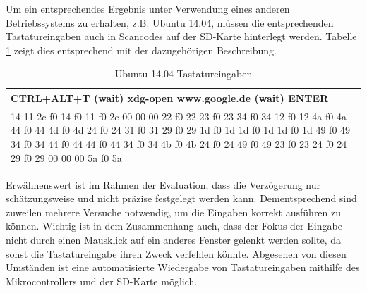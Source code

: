 Um ein entsprechendes Ergebnis unter Verwendung eines anderen Betriebssystems zu erhalten, z.B. Ubuntu 14.04, müssen die entsprechenden Tastatureingaben auch in Scancodes auf der SD-Karte hinterlegt werden. Tabelle \ref{linux_test} zeigt dies entsprechend mit der dazugehörigen Beschreibung.
\begin{table}
  \begin{tabularx}{\textwidth}{|X|} \hline
    CTRL+ALT+T (wait) xdg-open www.google.de (wait) ENTER \\ \hline
    14 11 2c f0 14 f0 11 f0 2c 00 00 00 22 f0 22 23 f0 23 34 f0 34 12 f0 12 4a f0 4a 44 f0 44 4d f0 4d 24 f0 24 31 f0 31 29 f0 29 1d f0 1d 1d f0 1d 1d f0 1d 49 f0 49 34 f0 34 44 f0 44 44 f0 44 34 f0 34 4b f0 4b 24 f0 24 49 f0 49 23 f0 23 24 f0 24 29 f0 29 00 00 00 5a f0 5a \\ \hline
  \end{tabularx}
  \caption{Ubuntu 14.04 Tastatureingaben}
  \label{linux_test}
\end{table}

\noindent Erwähnenswert ist im Rahmen der Evaluation, dass die Verzögerung nur schätzungsweise und nicht präzise festgelegt werden kann. Dementsprechend sind zuweilen mehrere Versuche notwendig, um die Eingaben korrekt ausführen zu können. Wichtig ist in dem Zusammenhang auch, dass der Fokus der Eingabe nicht durch einen Mausklick auf ein anderes Fenster gelenkt werden sollte, da sonst die Tastatureingabe ihren Zweck verfehlen könnte. Abgesehen von diesen Umständen ist eine automatisierte Wiedergabe von Tastatureingaben mithilfe des Mikrocontrollers und der SD-Karte möglich.



